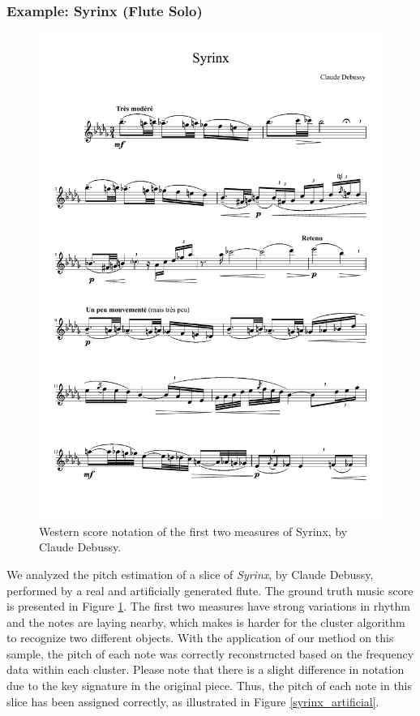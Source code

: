 \subsubsection{Example: Syrinx (Flute Solo)}
\begin{figure}[h]
\centering
\includegraphics[width=1\linewidth]{images/applications/syrinx_original.pdf}
\caption{Western score notation of the first two measures of Syrinx, by Claude Debussy.}
\label{syrinx_original} 
\end{figure}
We analyzed the pitch estimation of a slice of \textit{Syrinx}, by Claude Debussy, performed by a real and artificially generated flute. The ground truth music score is presented in Figure \ref{syrinx_original}.
The first two measures have strong variations in rhythm and the notes are laying nearby, which makes is harder for the cluster algorithm to recognize two different objects. With the application of our method on this sample, the pitch of each note was correctly reconstructed based on the frequency data within each cluster. Please note that there is a slight difference in notation due to the key signature in the original piece. Thus, the pitch of each note in this slice has been assigned correctly\sidenotemark{}, as illustrated in Figure \ref{syrinx_artificial}.



